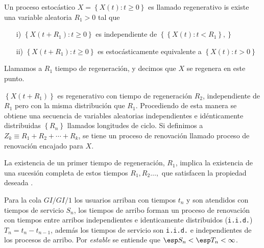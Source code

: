 

\begin{Def}
Un proceso estoc\'astico $X=\left\{X\left(t\right):t\geq0\right\}$ es llamado regenerativo is existe una variable aleatoria $R_{1}>0$ tal que
\begin{itemize}
\item[i)] $\left\{X\left(t+R_{1}\right):t\geq0\right\}$ es independiente de $\left\{\left\{X\left(t\right):t<R_{1}\right\},\right\}$
\item[ii)] $\left\{X\left(t+R_{1}\right):t\geq0\right\}$ es estoc\'asticamente equivalente a $\left\{X\left(t\right):t>0\right\}$
\end{itemize}

Llamamos a $R_{1}$ tiempo de regeneraci\'on, y decimos que $X$ se regenera en este punto.
\end{Def}

$\left\{X\left(t+R_{1}\right)\right\}$ es regenerativo con tiempo de regeneraci\'on $R_{2}$, independiente de $R_{1}$ pero con la misma distribuci\'on que $R_{1}$. Procediendo de esta manera se obtiene una secuencia de variables aleatorias independientes e id\'enticamente distribuidas $\left\{R_{n}\right\}$ llamados longitudes de ciclo. Si definimos a $Z_{k}\equiv R_{1}+R_{2}+\cdots+R_{k}$, se tiene un proceso de renovaci\'on llamado proceso de renovaci\'on encajado para $X$.


\begin{Note}
La existencia de un primer tiempo de regeneraci\'on, $R_{1}$, implica la existencia de una sucesi\'on completa de estos tiempos $R_{1},R_{2}\ldots,$ que satisfacen la propiedad deseada \cite{Sigman2}.
\end{Note}


\begin{Note} Para la cola $GI/GI/1$ los usuarios arriban con tiempos $t_{n}$ y son atendidos con tiempos de servicio $S_{n}$, los tiempos de arribo forman un proceso de renovaci\'on  con tiempos entre arribos independientes e identicamente distribuidos (\texttt{i.i.d.})$T_{n}=t_{n}-t_{n-1}$, adem\'as los tiempos de servicio son \texttt{i.i.d.} e independientes de los procesos de arribo. Por \textit{estable} se entiende que $\esp S_{n}<\esp T_{n}<\infty$.
\end{Note}
 


